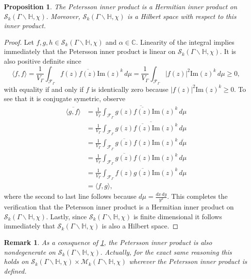 \documentclass[12pt]{book}
\newtheorem{proposition}{Proposition}[section]
\newtheorem{remark}{Remark}[section]
\theoremstyle{definition}\newframedtheorem{method}{Method}
\newcommand{\mc}{\mathcal}
\newcommand{\C}{\mathbb{C}}
\renewcommand{\H}{\mathbb{H}}
\renewcommand{\a}{\alpha}
\newcommand{\G}{\Gamma}
\newcommand{\x}{\times}
\newcommand{\<}{\langle}
\renewcommand{\>}{\rangle}
\newcommand{\conj}{\overline}
\renewcommand{\Im}{\mathrm{Im}}
\newcommand{\GH}{\G\backslash\H}
\begin{document}
      \begin{proposition}\label{prop:Petersson_inner_product_hermitian}
        The Petersson inner product is a Hermitian inner product on $\mc{S}_{k}(\GH,\chi)$. Moreover, $\mc{S}_{k}(\GH,\chi)$ is a Hilbert space with respect to this inner product.
      \end{proposition}
      \begin{proof}
        Let $f,g,h \in \mc{S}_{k}(\GH,\chi)$ and $\a \in \C$. Linearity of the integral implies immediately that the Petersson inner product is linear on $\mc{S}_{k}(\GH,\chi)$. It is also positive definite since
        \[
          \<f,f\> = \frac{1}{V_{\G}}\int_{\mc{F}_{\G}}f(z)\conj{f(z)}\Im(z)^{k}\,d\mu = \frac{1}{V_{\G}}\int_{\mc{F}_{\G}}|f(z)|^{2}\Im(z)^{k}\,d\mu \ge 0,
        \]
        with equality if and only if $f$ is identically zero because $|f(z)|^{2}\Im(z)^{k} \ge 0$. To see that it is conjugate symetric, observe
        \begin{align*}
          \conj{\<g,f\>} &= \conj{\frac{1}{V_{\G}}\int_{\mc{F}_{\G}}g(z)\conj{f(z)}\Im(z)^{k}\,d\mu} \\
          &= \frac{1}{V_{\G}}\int_{\mc{F}_{\G}}\conj{g(z)\conj{f(z)}\Im(z)^{k}\,d\mu} \\
          &= \frac{1}{V_{\G}}\int_{\mc{F}_{\G}}\conj{g(z)}f(z)\Im(z)^{k}\,\conj{d\mu} \\
          &= \frac{1}{V_{\G}}\int_{\mc{F}_{\G}}\conj{g(z)}f(z)\Im(z)^{k}\,d\mu \\
          &= \frac{1}{V_{\G}}\int_{\mc{F}_{\G}}f(z)\conj{g(z)}\Im(z)^{k}\,d\mu \\
          &= \<f,g\>,
        \end{align*}
        where the second to last line follows because $d\mu = \frac{dx\,dy}{y^{2}}$. This completes the verification that the Petersson inner product is a Hermitian inner product on $\mc{S}_{k}(\GH,\chi)$. Lastly, since $\mc{S}_{k}(\GH,\chi)$ is finite dimensional it follows immediately that $\mc{S}_{k}(\GH,\chi)$ is also a Hilbert space.
      \end{proof}

      \begin{remark}\label{rem:nondegeneracy_of_Petersson_inner_product}
        As a consquence of \cref{prop:Petersson_inner_product_hermitian}, the Petersson inner product is also nondegenerate on $\mc{S}_{k}(\GH,\chi)$. Actually, for the exact same reasoning this holds on $\mc{S}_{k}(\GH,\chi) \x \mc{M}_{k}(\GH,\chi)$ wherever the Petersson inner product is defined.
      \end{remark}
\end{document}
